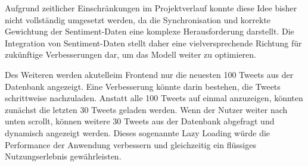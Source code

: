 \documentclass[conference,a4paper,flushend]{cs-techrep}
\begin{document}
Aufgrund zeitlicher Einschränkungen im Projektverlauf konnte diese Idee bisher nicht vollständig umgesetzt werden, da die Synchronisation und korrekte Gewichtung der Sentiment-Daten eine komplexe Herausforderung darstellt. Die Integration von Sentiment-Daten stellt daher eine vielversprechende Richtung für zukünftige Verbesserungen dar, um das Modell weiter zu optimieren.

Des Weiteren werden akutelleim Frontend nur die neuesten 100 Tweets aus der Datenbank angezeigt. Eine Verbesserung könnte darin bestehen, die Tweets schrittweise nachzuladen. Anstatt alle 100 Tweets auf einmal anzuzeigen, könnten zunächst die letzten 30 Tweets geladen werden. Wenn der Nutzer weiter nach unten scrollt, können weitere 30 Tweets aus der Datenbank abgefragt und dynamisch angezeigt werden. Dieses sogenannte Lazy Loading würde die Performance der Anwendung verbessern und gleichzeitig ein flüssiges Nutzungserlebnis gewährleisten.


\sloppy
\printbibliography[notcategory=selfref]
\end{document}
